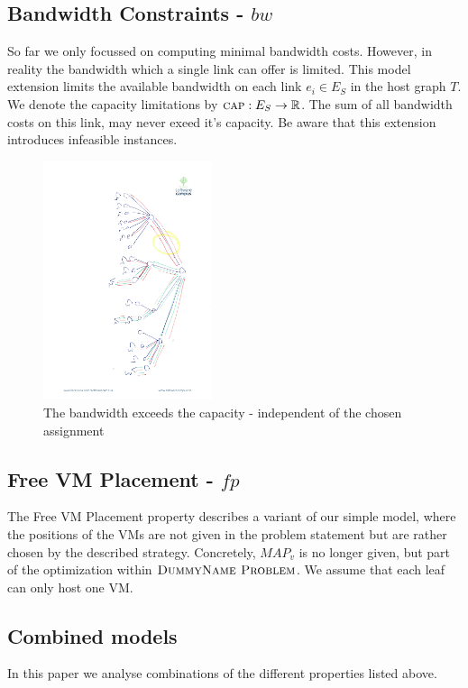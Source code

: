 \documentclass[9pt,twocolumn]{scrartcl}
\newcommand{\Capacity}{\ensuremath{\textsc{cap}}}
\newcommand{\Problem}{\textsc{DummyName Problem}}
\newcommand{\NodeMapping}{\ensuremath{MAP_v}}
\newcommand{\SubstrateEdges}{\ensuremath{E_S}}
\newcommand{\SubstrateEdge}{\ensuremath{e}}
\newcommand{\Tree}{\ensuremath{T}}
\begin{document}
\subsection{Bandwidth Constraints - $bw$}

So far we only focussed on computing minimal bandwidth costs. However, in
reality the bandwidth which a single link can offer is limited. This model
extension limits the available bandwidth on each link $\SubstrateEdge_i \in
\SubstrateEdges$ in the host graph $\Tree$. We denote the capacity limitations
by $\Capacity : \SubstrateEdges \rightarrow \mathbb{R}$. The sum of all
bandwidth costs on this link, may never exeed it's capacity. Be aware that
this extension introduces infeasible instances.

\begin{figure}

\includegraphics[angle=90,origin=c, height=7cm]{figs/model_fig_skteches/bw_ma_r_cv}
\caption{The bandwidth exceeds the capacity - independent of the chosen assignment}
\end{figure}
\subsection{Free VM Placement - $fp$}

The Free VM Placement property describes a variant of our simple model, where
the positions of the VMs are not given in the problem statement but are
rather chosen by the described strategy. Concretely, $\NodeMapping$ is no
longer given, but part of the optimization within $\Problem$. We assume that
each leaf can only host one VM.

\subsection{Combined models} In this paper we analyse combinations of the
different properties listed above.
\end{document}
